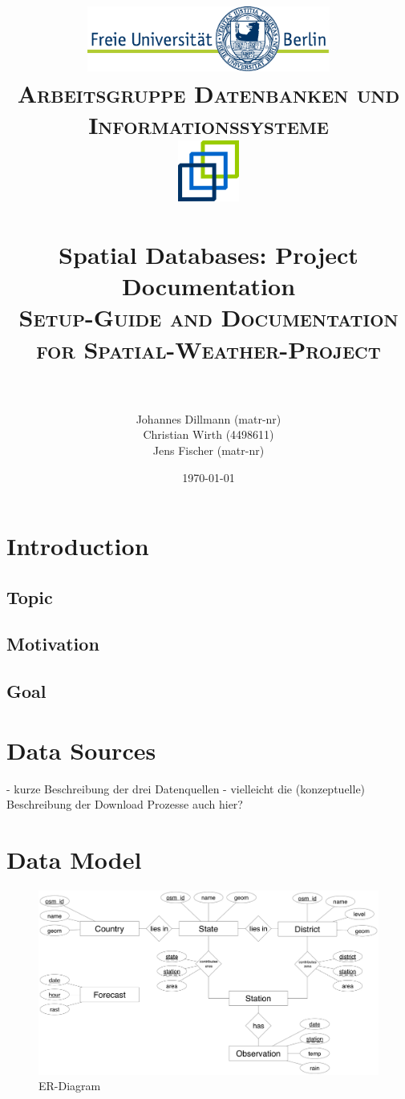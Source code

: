 \documentclass[paper=a4, fontsize=11pt]{scrartcl} %
\title{	
\normalfont \normalsize 
\textsc{\includegraphics[width=0.6\textwidth]{pictures/logo} \\ [5pt] Arbeitsgruppe Datenbanken und Informationssysteme \\ [20pt] \includegraphics[width=0.15\textwidth]{pictures/DBIS_Logo_rgb_web.png}} \\ [10pt] %
\horrule{0.5pt} \\[0.4cm] %
\huge Spatial Databases: Project Documentation \\ %
\normalsize \textsc{Setup-Guide and Documentation for Spatial-Weather-Project} \\ [0.4cm]
\horrule{2pt} \\[0.5cm] %
}
\author{Johannes Dillmann (matr-nr) \\ Christian Wirth (4498611) \\ Jens Fischer (matr-nr)}
\date{\normalsize\today} %
\numberwithin{equation}{section} %
\numberwithin{figure}{section} %
\numberwithin{table}{section} %
\begin{document}
\begin{titlepage}
\maketitle
\thispagestyle{empty}
\end{titlepage}

\newpage
\setcounter{page}{1}
\tableofcontents

\newpage
\listoffigures
{}

\newpage
{}
\pagestyle{fancy}
\setcounter{page}{1}

\section{Introduction}
	\subsection{Topic}
	\subsection{Motivation}
	\subsection{Goal}
\section{Data Sources}
	- kurze Beschreibung der drei Datenquellen
	- vielleicht die (konzeptuelle) Beschreibung der Download Prozesse auch hier?
	
\section{Data Model}
\begin{figure}[htbp]
\includegraphics[width=1.1\textwidth]{pictures/ER}
\caption{ER-Diagram}
\end{figure}
\end{document}
